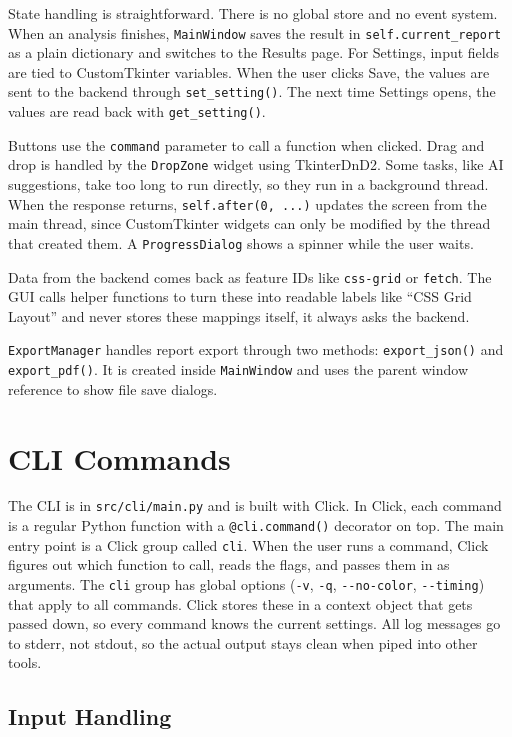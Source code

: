 State handling is straightforward. There is no global store and no event system. When an analysis finishes, \texttt{MainWindow} saves the result in \texttt{self.current\_report} as a plain dictionary and switches to the Results page. For Settings, input fields are tied to CustomTkinter variables. When the user clicks Save, the values are sent to the backend through \texttt{set\_setting()}. The next time Settings opens, the values are read back with \texttt{get\_setting()}.

Buttons use the \texttt{command} parameter to call a function when clicked. Drag and drop is handled by the \texttt{DropZone} widget using TkinterDnD2. Some tasks, like AI suggestions, take too long to run directly, so they run in a background thread. When the response returns, \texttt{self.after(0, ...)} updates the screen from the main thread, since CustomTkinter widgets can only be modified by the thread that created them. A \texttt{ProgressDialog} shows a spinner while the user waits.

Data from the backend comes back as feature IDs like \texttt{css-grid} or \texttt{fetch}. The GUI calls helper functions to turn these into readable labels like ``CSS Grid Layout'' and never stores these mappings itself, it always asks the backend.

\texttt{ExportManager} handles report export through two methods: \texttt{export\_json()} and \texttt{export\_pdf()}. It is created inside \texttt{MainWindow} and uses the parent window reference to show file save dialogs.

\section{CLI Commands}
\label{sec:cli}

The CLI is in \texttt{src/cli/main.py} and is built with Click. In Click, each command is a regular Python function with a \texttt{@cli.command()} decorator on top. The main entry point is a Click group called \texttt{cli}. When the user runs a command, Click figures out which function to call, reads the flags, and passes them in as arguments. The \texttt{cli} group has global options (\texttt{-v}, \texttt{-q}, \texttt{-{}-no-color}, \texttt{-{}-timing}) that apply to all commands. Click stores these in a context object that gets passed down, so every command knows the current settings. All log messages go to stderr, not stdout, so the actual output stays clean when piped into other tools.

\subsection{Input Handling}

